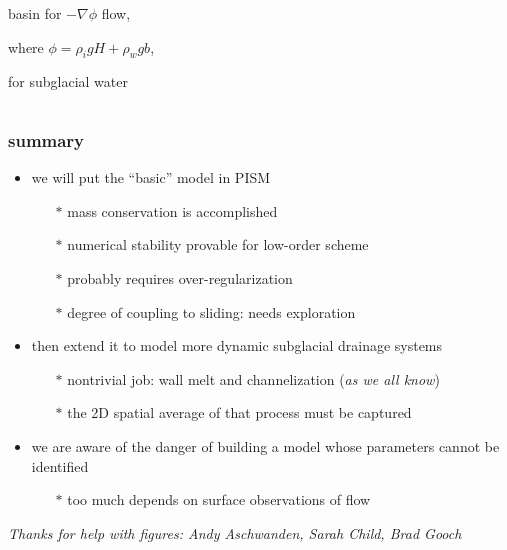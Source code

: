 \documentclass[hide notes,intlimits]{beamer}
\begin{document}
\begin{frame}
\begin{columns}
\begin{column}{0.5\textwidth}
\begin{center}
basin for $-\nabla \phi$ flow,

where $\phi = \rho_i g H + \rho_w g b$,

for subglacial water
\end{center}
\end{column}
\end{columns}

\end{frame}


{
} 


\begin{frame}
  \frametitle{summary}

  \begin{itemize}
  \item we will put the ``basic'' model in PISM
    \begin{itemize}
    \small
    \item[$\ast$] mass conservation is accomplished
    \item[$\ast$] numerical stability provable for low-order scheme
    \item[$\ast$] probably requires over-regularization
    \item[$\ast$] degree of coupling to sliding: needs exploration
    \end{itemize}
    \normalsize
  \item then extend it to model more dynamic subglacial drainage systems
    \begin{itemize}
    \small
    \item[$\ast$] nontrivial job: wall melt and channelization (\emph{as we all know})
    \item[$\ast$] the 2D spatial average of that process must be captured
    \end{itemize}
    \normalsize
  \item we are aware of the danger of building a model whose parameters cannot be identified
    \begin{itemize}
    \small
    \item[$\ast$] too much depends on surface observations of flow
    \end{itemize}
    \normalsize
  \end{itemize}

\vspace{17mm}
  \begin{center}
  \tiny \emph{Thanks for help with figures: Andy Aschwanden, Sarah Child, Brad Gooch}
  \end{center}
\end{frame}
\end{document}
